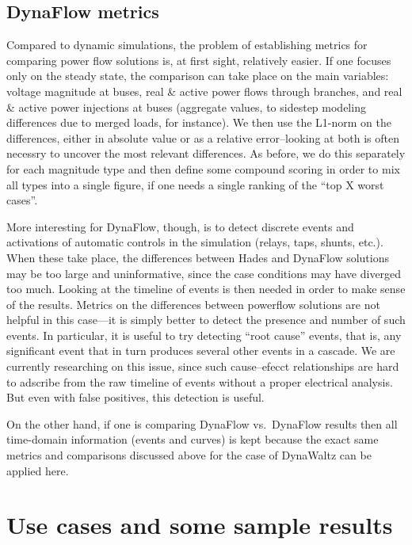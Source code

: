 \documentclass[conference]{IEEEtran}
\begin{document}
\subsection{DynaFlow metrics}

Compared to dynamic simulations, the problem of establishing metrics
for comparing power flow solutions is, at first sight, relatively
easier. If one focuses only on the steady state, the comparison can
take place on the main variables: voltage magnitude at buses, real \&
active power flows through branches, and real \& active power
injections at buses (aggregate values, to sidestep modeling
differences due to merged loads, for instance). We then use the
L1-norm on the differences, either in absolute value or as a relative
error--looking at both is often necessry to uncover the most relevant
differences. As before, we do this separately for each magnitude type
and then define some compound scoring in order to mix all types into a
single figure, if one needs a single ranking of the ``top X worst
cases''.

More interesting for DynaFlow, though, is to detect discrete events
and activations of automatic controls in the simulation (relays, taps,
shunts, etc.).  When these take place, the differences between Hades
and DynaFlow solutions may be too large and uninformative, since the
case conditions may have diverged too much.  Looking at the timeline
of events is then needed in order to make sense of the results.
Metrics on the differences between powerflow solutions are not helpful
in this case---it is simply better to detect the presence and number
of such events.  In particular, it is useful to try detecting ``root
cause'' events, that is, any significant event that in turn produces
several other events in a cascade.  We are currently researching on
this issue, since such cause--efecct relationships are hard to
adscribe from the raw timeline of events without a proper electrical
analysis. But even with false positives, this detection is useful.

On the other hand, if one is comparing DynaFlow vs.\ DynaFlow results
then all time-domain information (events and curves) is kept because
the exact same metrics and comparisons discussed above for the case of
DynaWaltz can be applied here.





\section{Use cases and some sample results}
\end{document}

